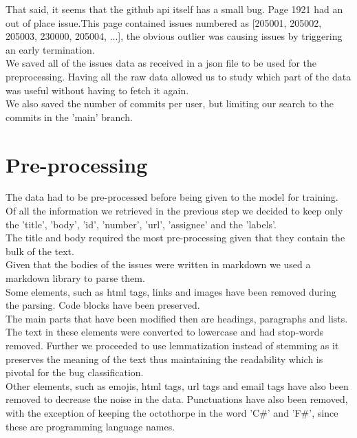 \documentclass[tikz,10pt,fleqn]{article}
\begin{document}
That said, it seems that the github api itself has a small bug. Page 1921 had an out of place issue.\newpage This page contained issues numbered as [205001, 205002, 205003, 230000, 205004, ...], the obvious outlier was causing issues by triggering an early termination.\\
We saved all of the issues data as received in a json file to be used for the preprocessing. Having all the raw data allowed us to study which part of the data was useful without having to fetch it again.\\

We also saved the number of commits per user, but limiting our search to the commits in the 'main' branch.


\section*{Pre-processing}
The data had to be pre-processed before being given to the model for training.\\ 
Of all the information we retrieved in the previous step we decided to keep only the 'title', 'body', 'id', 'number', 'url', 'assignee' and the 'labels'.\\
The title and body required the most pre-processing given that they contain the bulk of the text.\\
Given that the bodies of the issues were written in markdown we used a markdown library to parse them.\\
 Some elements, such as html tags, links and images have been removed during the parsing. Code blocks have been preserved.\\
The main parts that have been modified then are headings, paragraphs and lists.\\
The text in these elements were converted to lowercase and had stop-words removed. Further we proceeded to use lemmatization instead of stemming as it preserves the meaning of the text thus maintaining the readability which is pivotal for the bug classification.\\
Other elements, such as emojis, html tags, url tags and email tags have also been removed to decrease the noise in the data. Punctuations have also been removed, with the exception of keeping the octothorpe in the word 'C\#' and 'F\#', since these are programming language names.\\
\end{document}
